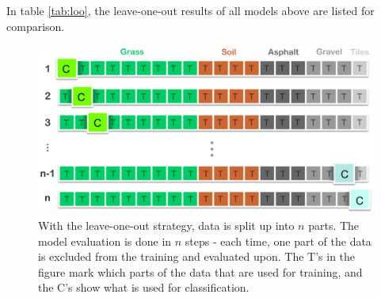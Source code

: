 In table \ref{tab:loo}, the leave-one-out results of all models above are listed for comparison.

\begin{figure}[h]
	\label{fig:loo}
	\centering
	\includegraphics[scale=0.3]{figs_temp/loo.jpg}
	\caption{With the leave-one-out strategy, data is split up into $n$ parts. The model evaluation is done in $n$ steps - each time, one part of the data is excluded from the training and evaluated upon. The T's in the figure mark which parts of the data that are used for training, and the C's show what is used for classification.}
\end{figure}

